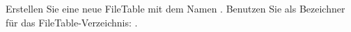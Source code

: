 \item Erstellen Sie eine neue FileTable mit dem Namen .
Benutzen Sie als Bezeichner für das
FileTable-Verzeichnis: .
